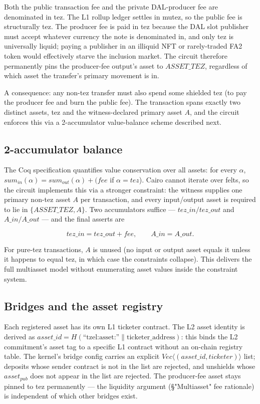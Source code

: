 \documentclass[11pt]{article}
\begin{document}
Both the public transaction fee and the private DAL-producer fee are
denominated in tez. The L1 rollup ledger settles in mutez, so the
public fee is structurally tez. The producer fee is paid in tez
because the DAL slot publisher must accept whatever currency the
note is denominated in, and only tez is universally liquid; paying a
publisher in an illiquid NFT or rarely-traded FA2 token would
effectively starve the inclusion market. The circuit therefore
permanently pins the producer-fee output's asset to \(ASSET\_TEZ\),
regardless of which asset the transfer's primary movement is in.

A consequence: any non-tez transfer must also spend some shielded
tez (to pay the producer fee and burn the public fee). The
transaction spans exactly two distinct assets, tez and the
witness-declared primary asset \(A\), and the circuit enforces this
via a 2-accumulator value-balance scheme described next.

\subsection{2-accumulator balance}

The Coq specification quantifies value conservation over all assets:
for every \(\alpha\), \(sum_{in}(\alpha) = sum_{out}(\alpha) + (fee\)
if \(\alpha = tez\)). Cairo cannot iterate over felts, so the circuit
implements this via a stronger constraint: the witness supplies one
primary non-tez asset \(A\) per transaction, and every input/output
asset is required to lie in \(\{ASSET\_TEZ, A\}\). Two accumulators
suffice — \(tez\_in / tez\_out\) and \(A\_in / A\_out\) — and the
final asserts are

\[
tez\_in = tez\_out + fee, \qquad A\_in = A\_out.
\]

For pure-tez transactions, \(A\) is unused (no input or output
asset equals it unless it happens to equal tez, in which case the
constraints collapse). This delivers the full multiasset model
without enumerating asset values inside the constraint system.

\subsection{Bridges and the asset registry}

Each registered asset has its own L1 ticketer contract. The L2
asset identity is derived as
\(asset\_id = H(\text{``tzel:asset:''} \parallel \text{ticketer\_address})\):
this binds the L2 commitment's asset tag to a specific L1 contract
without an on-chain registry table. The kernel's bridge config
carries an explicit \(Vec\langle (asset\_id, ticketer) \rangle\) list;
deposits whose sender contract is not in the list are rejected, and
unshields whose \(asset_{pub}\) does not appear in the list are
rejected. The producer-fee asset stays pinned to tez permanently —
the liquidity argument (§"Multiasset" fee rationale) is independent
of which other bridges exist.
\end{document}
